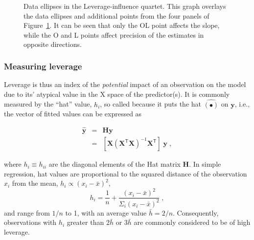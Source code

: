\documentclass[
  letterpaper,
  10pt,
  krantz2]{krantz}
\begin{document}
\begin{figure}[H]


\caption{\label{fig-levdemo2}Data ellipses in the Leverage-influence
quartet. This graph overlays the data ellipses and additional points
from the four panels of Figure~\ref{fig-levdemo2}. It can be seen that
only the OL point affects the slope, while the O and L points affect
precision of the estimates in opposite directions.}

\end{figure}%

\subsubsection{Measuring leverage}\label{measuring-leverage}

Leverage is thus an index of the \emph{potential} impact of an
observation on the model due to its' atypical value in the X space of
the predictor(s). It is commonly measured by the ``hat'' value, \(h_i\),
so called because it puts the hat \(\hat{(\bullet)}\) on \(\mathbf{y}\),
i.e., the vector of fitted values can be expressed as

\begin{eqnarray*}
\hat{\mathbf{y}} & = & \mathbf{H} \mathbf{y} \\
                 & = & [\mathbf{X} (\mathbf{X}^\mathsf{T} \mathbf{X})^{-1} \mathbf{X}^\mathsf{T}] \; \mathbf{y} \; ,
\end{eqnarray*}

where \(h_i \equiv h_{ii}\) are the diagonal elements of the Hat matrix
\(\mathbf{H}\). In simple regression, hat values are proportional to the
squared distance of the observation \(x_i\) from the mean,
\(h_i \propto (x_i - \bar{x})^2\), \[
h_i = \frac{1}{n} + \frac{(x_i - \bar{x})^2}{\Sigma_i (x_i - \bar{x})^2} \; ,
\] and range from \(1/n\) to 1, with an average value \(\bar{h} = 2/n\).
Consequently, observations with \(h_i\) greater than \(2 \bar{h}\) or
\(3 \bar{h}\) are commonly considered to be of high leverage.
\end{document}
